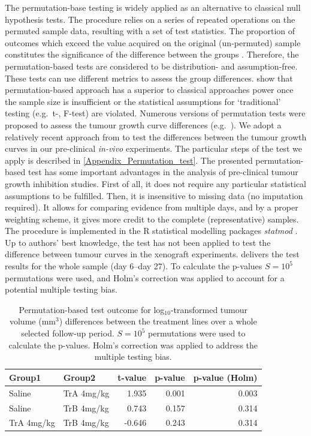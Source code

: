 The permutation-base testing is widely applied as an alternative to classical null hypothesis tests.
The procedure relies on a series of repeated operations on the permuted sample data, resulting with a set of test statistics.
The proportion of outcomes which exceed the value acquired on the original (un-permuted) sample constitutes the significance of the difference between the groups \autocite{Ninness:2002ft}.
Therefore, the permutation-based tests are considered to be distribution- and assumption-free.
These tests can use different metrics to assess the group differences.
\textcite{PeresNeto:2001hz,Ludbrook:1998iv} show that permutation-based approach has a superior to classical approaches power once the sample size is insufficient or the statistical assumptions for `traditional' testing (e.g.\ t-, F-test) are violated.
Numerous versions of permutation tests were proposed to assess the tumour growth curve differences (e.g.\, \textcite{Koziol:1981gg,Rocchetti:1990bu}).
We adopt a relatively recent approach from \textcite{Elso:2004jp} to test the differences between the tumour growth curves in our pre-clinical \emph{in-vivo} experiments.
The particular steps of the test we apply is described in \cref{Appendix_Permutation_test}.
The presented permutation-based test has some important advantages in the analysis of pre-clinical tumour growth inhibition studies.
First of all, it does not require any particular statistical assumptions to be fulfilled.
Then, it is insensitive to missing data (no imputation required).
It allows for comparing evidence from multiple days, and by a proper weighting scheme, it gives more credit to the complete (representative) samples.
The procedure is implemented in the R statistical modelling packages \emph{statmod} \autocite{statmod:2013}.
Up to authors' best knowledge, the test has not been applied to test the difference between tumour curves in the xenograft experiments.
 delivers the test results for the whole sample (day 6--day 27).
To calculate the p-values $S=10^5$ permutations were used, and Holm's correction was applied to account for a potential multiple testing bias.

\begin{table}
	\centering
	\begin{tabular}{llrrr}
		\hline
		Group1     & Group2     & t-value & p-value & p-value (Holm) \\
		\hline
		Saline     & TrA 4mg/kg & 1.935   & 0.001   & 0.003          \\
		Saline     & TrB 4mg/kg & 0.743   & 0.157   & 0.314          \\
		TrA 4mg/kg & TrB 4mg/kg & -0.646  & 0.243   & 0.314          \\
		\hline
	\end{tabular}
	\caption{Permutation-based test outcome for log$_{10}$-transformed tumour volume (mm$^3$) differences between the treatment lines over a whole selected follow-up period.
		$S=10^5$ permutations were used to calculate the p-values.
	Holm's correction was applied to address the multiple testing bias.}
	\label{permutation_test_table_log_whole_follow-up}
\end{table}

